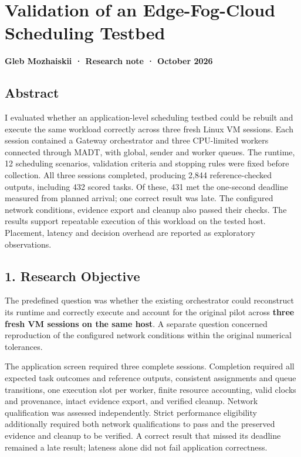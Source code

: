\documentclass[11pt,a4paper]{article}
\begin{document}
\section{Validation of an Edge-Fog-Cloud Scheduling
Testbed}\label{validation-of-an-edge-fog-cloud-scheduling-testbed}

\textbf{Gleb Mozhaiskii · Research note · October 2026}

\subsection{Abstract}\label{abstract}

I evaluated whether an application-level scheduling testbed could be
rebuilt and execute the same workload correctly across three fresh Linux
VM sessions. Each session contained a Gateway orchestrator and three
CPU-limited workers connected through MADT, with global, sender and
worker queues. The runtime, 12 scheduling scenarios, validation criteria
and stopping rules were fixed before collection. All three sessions
completed, producing 2,844 reference-checked outputs, including 432
scored tasks. Of these, 431 met the one-second deadline measured from
planned arrival; one correct result was late. The configured network
conditions, evidence export and cleanup also passed their checks. The
results support repeatable execution of this workload on the tested
host. Placement, latency and decision overhead are reported as
exploratory observations.

\subsection{1. Research Objective}\label{research-objective}

The predefined question was whether the existing orchestrator could
reconstruct its runtime and correctly execute and account for the
original pilot across \textbf{three fresh VM sessions on the same host}.
A separate question concerned reproduction of the configured network
conditions within the original numerical tolerances.

The application screen required three complete sessions. Completion
required all expected task outcomes and reference outputs, consistent
assignments and queue transitions, one execution slot per worker, finite
resource accounting, valid clocks and provenance, intact evidence
export, and verified cleanup. Network qualification was assessed
independently. Strict performance eligibility additionally required both
network qualifications to pass and the preserved evidence and cleanup to
be verified. A correct result that missed its deadline remained a late
result; lateness alone did not fail application correctness.
\end{document}
